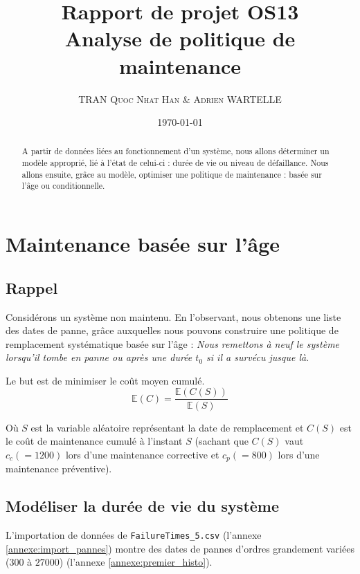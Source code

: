 \documentclass[10pt,a4paper]{article}
\author{\textsc{TRAN Quoc Nhat Han} \& \textsc{Adrien WARTELLE}}
\title{Rapport de projet OS13\\Analyse de politique de maintenance}
\date{\today}
\begin{document}
\maketitle
\renewcommand{\contentsname}{Sommaire}
\tableofcontents
\begin{abstract}
A partir de données liées au fonctionnement d'un système, nous allons déterminer un modèle approprié, lié à l'état de celui-ci :
durée de vie ou niveau de défaillance. Nous allons ensuite, grâce au modèle, optimiser une politique de maintenance : basée sur l'âge ou conditionnelle. 
\end{abstract}
\section{Maintenance basée sur l'âge}
\subsection{Rappel}
Considérons un système non maintenu. En l'observant, nous obtenons une liste des dates de panne, grâce auxquelles nous pouvons construire une politique de remplacement systématique basée sur l'âge : \emph{Nous remettons à neuf le système lorsqu'il tombe en panne ou après une durée $t_0$ si il a survécu jusque là}.

Le but est de minimiser le coût moyen cumulé.
\begin{equation}
    \label{coutmoyduree}
    \mathbb{E}(C) = \frac{\mathbb{E}(C(S))}{\mathbb{E}(S)}
\end{equation}

Où $S$ est la variable aléatoire représentant la date de remplacement et $C(S)$ est le coût de maintenance cumulé à l'instant $S$ (sachant que $C(S)$ vaut $c_c (=1200)$ lors d'une maintenance corrective et $c_p(=800)$ lors d'une maintenance préventive).
\subsection{Modéliser la durée de vie du système}
L'importation de données de \texttt{FailureTimes\_5.csv} (l'annexe \ref{annexe:import_pannes}) montre des dates de pannes d'ordres grandement variées ($300$ à $27000$) (l'annexe \ref{annexe:premier_histo}). 
\end{document}
